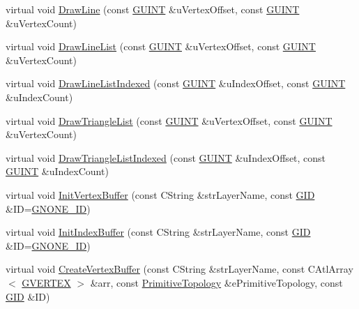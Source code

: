 \begin{DoxyCompactItemize}
\item 
virtual void \hyperlink{class_c_g_d_c_direct_x11_afe7876cdf5bff6ea40e057b125b4dde7}{Draw\+Line} (const \hyperlink{_g_types_8h_a415305cdf38fc38f67c037973e9a748c}{G\+U\+I\+N\+T} \&u\+Vertex\+Offset, const \hyperlink{_g_types_8h_a415305cdf38fc38f67c037973e9a748c}{G\+U\+I\+N\+T} \&u\+Vertex\+Count)
\item 
virtual void \hyperlink{class_c_g_d_c_direct_x11_ae9d734af8aa5f0e20656c364e2a848d5}{Draw\+Line\+List} (const \hyperlink{_g_types_8h_a415305cdf38fc38f67c037973e9a748c}{G\+U\+I\+N\+T} \&u\+Vertex\+Offset, const \hyperlink{_g_types_8h_a415305cdf38fc38f67c037973e9a748c}{G\+U\+I\+N\+T} \&u\+Vertex\+Count)
\item 
virtual void \hyperlink{class_c_g_d_c_direct_x11_aef12675ec35db5a0eb1bf4f124fdba75}{Draw\+Line\+List\+Indexed} (const \hyperlink{_g_types_8h_a415305cdf38fc38f67c037973e9a748c}{G\+U\+I\+N\+T} \&u\+Index\+Offset, const \hyperlink{_g_types_8h_a415305cdf38fc38f67c037973e9a748c}{G\+U\+I\+N\+T} \&u\+Index\+Count)
\item 
virtual void \hyperlink{class_c_g_d_c_direct_x11_a2863ecea0be4e88565fb54a0ff1019c2}{Draw\+Triangle\+List} (const \hyperlink{_g_types_8h_a415305cdf38fc38f67c037973e9a748c}{G\+U\+I\+N\+T} \&u\+Vertex\+Offset, const \hyperlink{_g_types_8h_a415305cdf38fc38f67c037973e9a748c}{G\+U\+I\+N\+T} \&u\+Vertex\+Count)
\item 
virtual void \hyperlink{class_c_g_d_c_direct_x11_a07ecb89058d72818e40c56705cd09d67}{Draw\+Triangle\+List\+Indexed} (const \hyperlink{_g_types_8h_a415305cdf38fc38f67c037973e9a748c}{G\+U\+I\+N\+T} \&u\+Index\+Offset, const \hyperlink{_g_types_8h_a415305cdf38fc38f67c037973e9a748c}{G\+U\+I\+N\+T} \&u\+Index\+Count)
\item 
virtual void \hyperlink{class_c_g_d_c_direct_x11_a61cd96ab41c7519a0f5c475c1acd2d0a}{Init\+Vertex\+Buffer} (const C\+String \&str\+Layer\+Name, const \hyperlink{_g_types_8h_a5b96ecb16d8e437977d12cd40aa6f6d8}{G\+I\+D} \&I\+D=\hyperlink{_g_types_8h_a3d3e95c8557b67abe2ddd1726a2e4d9a}{G\+N\+O\+N\+E\+\_\+\+I\+D})
\item 
virtual void \hyperlink{class_c_g_d_c_direct_x11_a0b9e283f8b85d4f4699510b4125599df}{Init\+Index\+Buffer} (const C\+String \&str\+Layer\+Name, const \hyperlink{_g_types_8h_a5b96ecb16d8e437977d12cd40aa6f6d8}{G\+I\+D} \&I\+D=\hyperlink{_g_types_8h_a3d3e95c8557b67abe2ddd1726a2e4d9a}{G\+N\+O\+N\+E\+\_\+\+I\+D})
\item 
virtual void \hyperlink{class_c_g_d_c_direct_x11_ac3c44560ddd514467de7eb27d3c505ac}{Create\+Vertex\+Buffer} (const C\+String \&str\+Layer\+Name, const C\+Atl\+Array$<$ \hyperlink{struct_g_v_e_r_t_e_x}{G\+V\+E\+R\+T\+E\+X} $>$ \&arr, const \hyperlink{_g_types_8h_a940e3da6a9b57aae3de0b050e2a7af5e}{Primitive\+Topology} \&e\+Primitive\+Topology, const \hyperlink{_g_types_8h_a5b96ecb16d8e437977d12cd40aa6f6d8}{G\+I\+D} \&I\+D)

\end{DoxyCompactItemize}
